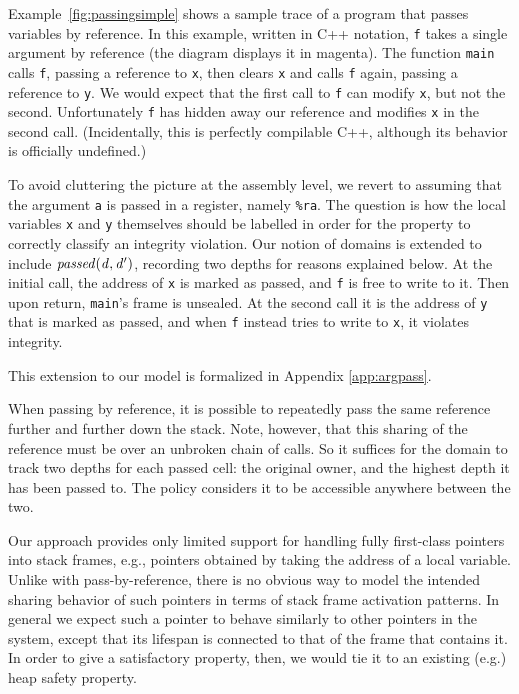 \documentclass[10pt,conference]{ieeetran}%
\theoremstyle{definition}
\begin{document}
{Example~\ref{fig:passingsimple} shows a sample trace of a program that passes
variables by reference. In this example, written in C++ notation,
{\tt f} takes a single argument by reference (the diagram displays it in magenta). The function
{\tt main} calls {\tt f}, passing a reference to {\tt x}, then clears {\tt x} and calls
{\tt f} again, passing a reference to {\tt y}.
We would expect that the first call to {\tt f} can modify
{\tt x}, but not the second. Unfortunately {\tt f} has hidden away our reference and modifies
{\tt x} in the second call. (Incidentally, this is perfectly compilable C++,
although its behavior is officially undefined.)

To avoid cluttering the picture at the assembly level, we revert to assuming that the
argument {\tt a} is passed in a register, namely {\tt \%ra}.
The question is how the local variables {\tt x} and {\tt y} themselves
should be labelled in order for the property to correctly classify an integrity violation.
Our notion of domains is extended to include \(\mathit{passed(d,d')}\),
recording two depths for reasons explained below.
At the initial call, the address of {\tt x} is marked as passed, and {\tt f} is free to write to it. Then upon
return, {\tt main}'s frame is unsealed. At the second call it is the address of {\tt y} that is marked as passed,
and when {\tt f} instead tries to write to {\tt x}, it violates integrity.

This extension to our model is formalized in Appendix \ref{app:argpass}.

When passing by reference, it is possible to repeatedly pass the same reference further
and further down the stack. Note, however, that this sharing of the reference must be over
an unbroken chain of calls. So it suffices for the domain to track two depths for each passed
cell: the original owner, and the highest depth it has been passed to. The policy considers
it to be accessible anywhere between the two.

Our approach provides only limited support for handling fully first-class pointers into
stack frames, e.g., pointers obtained by taking the address of a local variable.
Unlike with pass-by-reference, there is no obvious way to model the intended
sharing behavior of such pointers in terms of stack frame activation patterns.
In general we expect such a pointer to behave similarly to other pointers in
the system, except that its lifespan is connected to that of the frame that contains
it. In order to give a satisfactory property, then, we would tie it to an existing (e.g.)
heap safety property.

}
\end{document}
